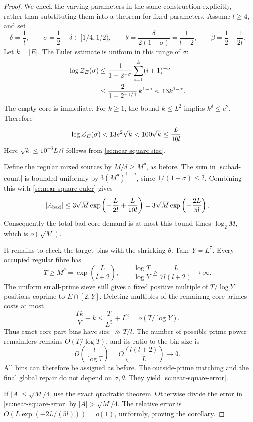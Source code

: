 \begin{proof}
We check the varying parameters in the same construction explicitly,
rather than substituting them into a theorem for fixed parameters.
Assume \(l\ge4\), and set
\[
 \delta=\frac1l,\qquad
 \sigma=\frac12-\delta\in[1/4,1/2),\qquad
 \theta=\frac{\delta}{2(1-\sigma)}=\frac1{l+2},\qquad
 \beta=\frac12-\frac1{2l}.
\]
Let \(k=|E|\). The Euler estimate is uniform in this range of
\(\sigma\):
\[
 \begin{split}
 \log{\cal Z}_E(\sigma)
 &\le\frac1{1-2^{-\sigma}}
                       \sum_{i=1}^k(i+1)^{-\sigma}\\
 &\le\frac{2}{1-2^{-1/4}}\,k^{1-\sigma}
 <13k^{1-\sigma}.
 \end{split}
\]
The empty core is immediate. For \(k\ge1\), the bound \(k\le L^2\)
implies \(k^\delta\le e^2\). Therefore
\begin{equation}
 \log{\cal Z}_E(\sigma)
 <13e^2\sqrt k<100\sqrt k\le\frac{L}{10l}.
 \label{sc:near-square-euler}
\end{equation}
Here \(\sqrt k\le10^{-3}L/l\) follows from
\eqref{sc:near-square-size}.

Define the regular mixed sources by \(M/d\ge M^\theta\), as
before. The sum in \eqref{sc:bad-count} is bounded uniformly by
\(3(M^\theta)^{1-\sigma}\), since \(1/(1-\sigma)\le2\).
Combining this with \eqref{sc:near-square-euler} gives
\[
 |A_{\rm bad}|
 \le3\sqrt M\exp\left(-\frac{L}{2l}+\frac{L}{10l}\right)
 =3\sqrt M\exp\left(-\frac{2L}{5l}\right).
\]
Consequently the total bad core demand is at most this bound times
\(\log_2M\), which is \(o(\sqrt M)\).

It remains to check the target bins with the shrinking \(\theta\).
Take \(Y=L^7\). Every occupied regular fibre has
\[
 T\ge M^\theta=\exp\left(\frac L{l+2}\right),\qquad
 \frac{\log T}{\log Y}\ge\frac{L}{7l(l+2)}\longrightarrow\infty.
\]
The uniform small-prime sieve still gives a fixed positive multiple
of \(T/\log Y\) positions coprime to \(E\cap[2,Y]\).
Deleting multiples of the remaining core primes costs at most
\[
 \frac{Tk}{Y}+k\le\frac T{L^5}+L^2=o(T/\log Y).
\]
Thus exact-core-part bins have size \(\gg T/l\).
The number of possible prime-power remainders remains
\(O(T/\log T)\), and its ratio to the bin size is
\[
 O\left(\frac l{\log T}\right)
 =O\left(\frac{l(l+2)}L\right)\longrightarrow0.
\]
All bins can therefore be assigned as before. The outside-prime
matching and the final global repair do not depend on
\(\sigma,\theta\). They yield \eqref{sc:near-square-error}.

If \(|A|\le\sqrt M/4\), use the exact quadratic theorem.
Otherwise divide the error in \eqref{sc:near-square-error} by
\(|A|>\sqrt M/4\). The relative error is
\(O(L\exp(-2L/(5l)))=o(1)\), uniformly, proving the corollary.
\end{proof}

